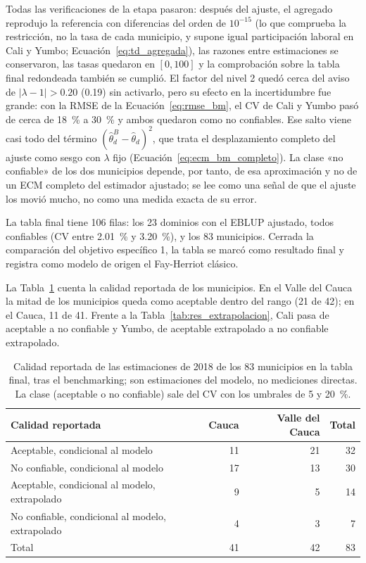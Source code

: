 Todas las verificaciones de la etapa pasaron: después del ajuste, el agregado reprodujo la referencia con diferencias del orden de $10^{-15}$ (lo que comprueba la restricción, no la tasa de cada municipio, y supone igual participación laboral en Cali y Yumbo; Ecuación~\ref{eq:td_agregada}), las razones entre estimaciones se conservaron, las tasas quedaron en $[0, 100]$ y la comprobación sobre la tabla final redondeada también se cumplió. El factor del nivel 2 quedó cerca del aviso de $|\lambda - 1| > 0.20$ (0.19) sin activarlo, pero su efecto en la incertidumbre fue grande: con la RMSE de la Ecuación~\ref{eq:rmse_bm}, el CV de Cali y Yumbo pasó de cerca de 18~\% a 30~\% y ambos quedaron como no confiables. Ese salto viene casi todo del término $(\hat{\theta}^{B}_d - \hat{\theta}_d)^2$, que trata el desplazamiento completo del ajuste como sesgo con $\lambda$ fijo (Ecuación~\ref{eq:ecm_bm_completo}). La clase «no confiable» de los dos municipios depende, por tanto, de esa aproximación y no de un ECM completo del estimador ajustado; se lee como una señal de que el ajuste los movió mucho, no como una medida exacta de su error.

La tabla final tiene 106 filas: los 23 dominios con el EBLUP ajustado, todos confiables (CV entre 2.01~\% y 3.20~\%), y los 83 municipios.
Cerrada la comparación del objetivo específico 1, la tabla se marcó como resultado final y registra como modelo de origen el Fay-Herriot clásico.

La Tabla~\ref{tab:res_calidad} cuenta la calidad reportada de los municipios. En el Valle del Cauca la mitad de los municipios queda como aceptable dentro del rango (21 de 42); en el Cauca, 11 de 41. Frente a la Tabla~\ref{tab:res_extrapolacion}, Cali pasa de aceptable a no confiable y Yumbo, de aceptable extrapolado a no confiable extrapolado.

\begin{table}[!htbp]
\centering
\small
\caption{Calidad reportada de las estimaciones de 2018 de los 83 municipios en la tabla final, tras el benchmarking; son estimaciones del modelo, no mediciones directas. La clase (aceptable o no confiable) sale del CV con los umbrales de 5 y 20~\%.}
\label{tab:res_calidad}
\begin{tabular}{l r r r}
\toprule
Calidad reportada & Cauca & Valle del Cauca & Total \\
\midrule
Aceptable, condicional al modelo & 11 & 21 & 32 \\
No confiable, condicional al modelo & 17 & 13 & 30 \\
Aceptable, condicional al modelo, extrapolado & 9 & 5 & 14 \\
No confiable, condicional al modelo, extrapolado & 4 & 3 & 7 \\
\midrule
Total & 41 & 42 & 83 \\
\bottomrule
\end{tabular}
\end{table}

